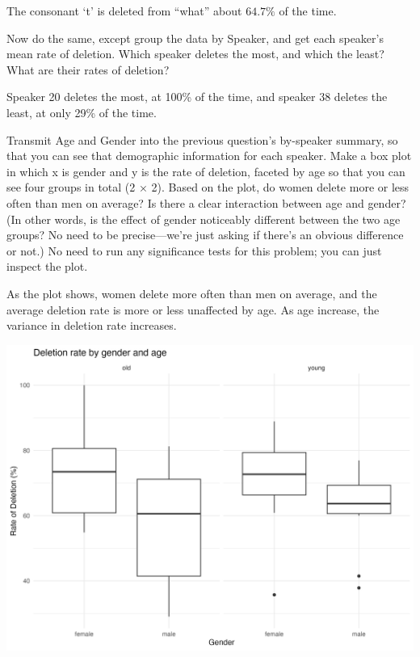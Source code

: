 \documentclass{../../templates/lkx_pset}
\begin{document}
The consonant `t' is deleted from ``what'' about $64.7\%$ of the time.

\begin{problem}{7}
Now do the same, except group the data by Speaker, and get each speaker’s mean rate of deletion. Which speaker deletes the most, and which the least? What are their rates of deletion?
\end{problem}

Speaker 20 deletes the most, at 100\% of the time, and speaker 38 deletes the least, at only 29\% of the time.

\begin{problem}{8}
Transmit Age and Gender into the previous question’s by-speaker summary, so that you can see that demographic information for each speaker. Make a box plot in which x is gender and y is the rate of deletion, faceted by age so that you can see four groups in total (2 × 2). Based on the plot, do women delete more or less often than men on average? Is there a clear interaction between age and gender? (In other words, is the effect of gender noticeably different between the two age groups? No need to be precise—we’re just asking if there’s an obvious difference or not.) No need to run any significance tests for this problem; you can just inspect the plot.
\end{problem}

As the plot shows, women delete more often than men on average, and the average deletion rate is more or less unaffected by age. As age increase, the variance in deletion rate increases.

\begin{center}
\includegraphics[]{problem8.png}
\end{center}
\end{document}
